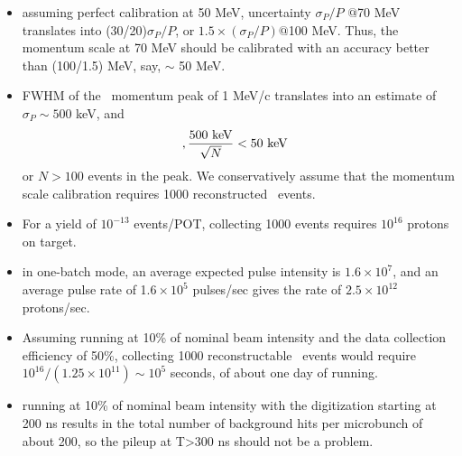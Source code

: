 \begin{itemize}
\item
  assuming perfect calibration at 50 MeV, uncertainty $\sigma_P/P$ $@$70 MeV translates
  into (30/20)$\sigma_P/P$, or $1.5\times(\sigma_P/P)@$100 MeV.
  Thus, the momentum scale at 70 MeV should be calibrated with an accuracy better
  than (100/1.5) MeV, say, $\sim$ 50 MeV.
\item
  FWHM of the \piplusenu\ momentum peak of 1 MeV/c translates into an estimate of
  $\sigma_P \sim 500$ keV, and 
  $$,
  \frac {500 {\rm ~keV}}{\sqrt N} <  50 {\rm ~keV} ~~
  $$
  or $N > 100$ events in the peak. We conservatively assume that the momentum scale calibration
  requires 1000 reconstructed \piplusenu\ events.
\item
  For a yield of $10^{-13}$ events/POT, collecting 1000 events requires $10^{16}$ protons on target.
\item
  in one-batch mode, an average expected pulse intensity is $1.6 \times 10^7$, and
  an average  pulse rate of 1$.6 \times 10^5$ pulses/sec gives the rate of $2.5 \times 10^{12}$ protons/sec.
\item
  Assuming running at 10\% of nominal beam intensity and the data collection efficiency of 50\%,
  collecting 1000 reconstructable \piplusenu\ events would require
  $10^{16}/(1.25 \times 10^{11}) \sim 10^5$ seconds, of about one day of running.
\item
  running at 10\% of nominal beam intensity with the digitization starting at 200 ns results in 
  the total number of background hits per microbunch of about 200, so the pileup at T>300 ns
  should not be a problem.
\end{itemize}

